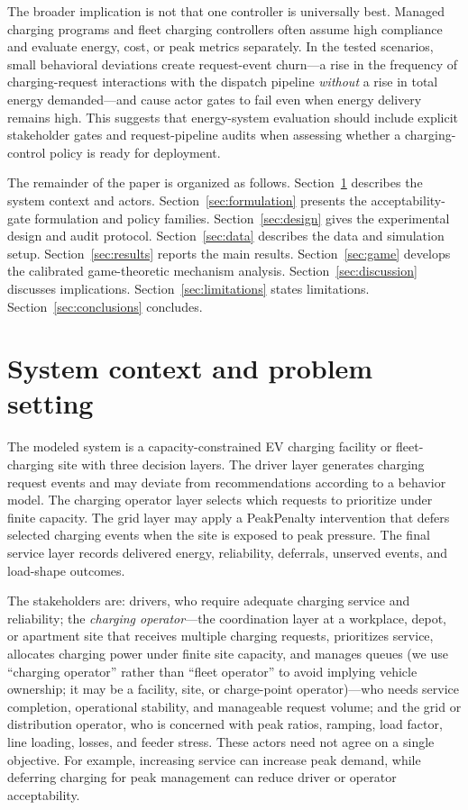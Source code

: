\documentclass[12pt]{article}
\begin{document}
The broader implication is not that one controller is universally best. Managed charging programs and fleet charging controllers often assume high compliance and evaluate energy, cost, or peak metrics separately. In the tested scenarios, small behavioral deviations create request-event churn---a rise in the frequency of charging-request interactions with the dispatch pipeline \emph{without} a rise in total energy demanded---and cause actor gates to fail even when energy delivery remains high. This suggests that energy-system evaluation should include explicit stakeholder gates and request-pipeline audits when assessing whether a charging-control policy is ready for deployment.

The remainder of the paper is organized as follows. Section~\ref{sec:system} describes the system context and actors. Section~\ref{sec:formulation} presents the acceptability-gate formulation and policy families. Section~\ref{sec:design} gives the experimental design and audit protocol. Section~\ref{sec:data} describes the data and simulation setup. Section~\ref{sec:results} reports the main results. Section~\ref{sec:game} develops the calibrated game-theoretic mechanism analysis. Section~\ref{sec:discussion} discusses implications. Section~\ref{sec:limitations} states limitations. Section~\ref{sec:conclusions} concludes.

\section{System context and problem setting}\label{sec:system}

The modeled system is a capacity-constrained EV charging facility or fleet-charging site with three decision layers. The driver layer generates charging request events and may deviate from recommendations according to a behavior model. The charging operator layer selects which requests to prioritize under finite capacity. The grid layer may apply a PeakPenalty intervention that defers selected charging events when the site is exposed to peak pressure. The final service layer records delivered energy, reliability, deferrals, unserved events, and load-shape outcomes.

The stakeholders are: drivers, who require adequate charging service and reliability; the \emph{charging operator}---the coordination layer at a workplace, depot, or apartment site that receives multiple charging requests, prioritizes service, allocates charging power under finite site capacity, and manages queues (we use ``charging operator'' rather than ``fleet operator'' to avoid implying vehicle ownership; it may be a facility, site, or charge-point operator)---who needs service completion, operational stability, and manageable request volume; and the grid or distribution operator, who is concerned with peak ratios, ramping, load factor, line loading, losses, and feeder stress. These actors need not agree on a single objective. For example, increasing service can increase peak demand, while deferring charging for peak management can reduce driver or operator acceptability.
\end{document}
